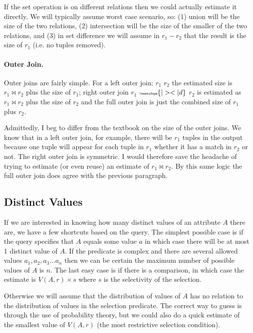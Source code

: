 \documentclass[a4paper]{report}
\begin{document}
If the set operation is on different relations then we could actually estimate it directly. We will typically assume worst case scenario, so: (1) union will be the size of the two relations, (2) intersection will be the size of the smaller of the two relations, and (3) in set difference we will assume in $r_{1} - r_{2}$ that the result is the size of $r_{1}$ (i.e. no tuples removed). 


\paragraph{Outer Join.} Outer joins are fairly simple. For a left outer join: $r_{1}$ {\tiny {}} $r_{2}$ the estimated size is $r_{1} \bowtie r_{2}$ plus the size of $r_{1}$; right outer join $r_{1}$ ${\tiny \textifsym{|><|d}}$ $r_{2}$ is estimated as $r_{1} \bowtie r_{2}$ plus the size of $r_{2}$ and the full outer join {\tiny {}} is just the combined size of $r_{1}$ plus $r_{2}$.

Admittedly, I beg to differ from the textbook on the size of the outer joins. We know that in a left outer join, for example, there will be $r_{1}$ tuples in the output because one tuple will appear for each tuple in $r_{1}$ whether it has a match in $r_{2}$ or not. The right outer join is symmetric. I would therefore save the headache of trying to estimate (or even reuse) an estimate of $r_{1} \bowtie r_{2}$. By this same logic the full outer join does agree with the previous paragraph.

\subsection*{Distinct Values}

If we are interested in knowing how many distinct values of an attribute $A$ there are, we have a few shortcuts based on the query. The simplest possible case is if the query specifies that $A$ equals some value $a$ in which case there will be at most 1 distinct value of $A$. If the predicate is complex and there are several allowed values $a_{1}, a_{2}, a_{3}... a_{n}$ then we can be certain the maximum number of possible values of $A$ is $n$. The last easy case is if there is a comparison, in which case the estimate is $V(A,r) \times s$ where $s$ is the selectivity of the selection.

Otherwise we will assume that the distribution of values of $A$ has no relation to the distribution of values in the selection predicate. The correct way to guess is through the use of probability theory, but we could also do a quick estimate of the smallest value of $V(A, r)$ (the most restrictive selection condition). 
\end{document}

